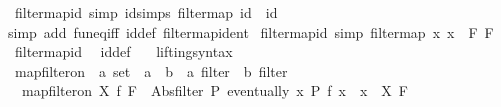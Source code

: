 \begin{isabellebody}
{\isafolddocument}%
%
\isadelimdocument
%
\endisadelimdocument
{}\isamarkupfalse%
\ filtermap{\isacharunderscore}{\kern0pt}id\ {\isacharbrackleft}{\kern0pt}simp{\isacharcomma}{\kern0pt}\ id{\isacharunderscore}{\kern0pt}simps{\isacharbrackright}{\kern0pt}{\isacharcolon}{\kern0pt}\ {\isachardoublequoteopen}filtermap\ id\ {\isacharequal}{\kern0pt}\ id{\isachardoublequoteclose}\isanewline
%
\isadelimproof
%
\endisadelimproof
%
\isatagproof
{}\isamarkupfalse%
{\isacharparenleft}{\kern0pt}simp\ add{\isacharcolon}{\kern0pt}\ fun{\isacharunderscore}{\kern0pt}eq{\isacharunderscore}{\kern0pt}iff\ id{\isacharunderscore}{\kern0pt}def\ filtermap{\isacharunderscore}{\kern0pt}ident{\isacharparenright}{\kern0pt}%
\endisatagproof
{\isafoldproof}%
%
\isadelimproof
\isanewline
%
\endisadelimproof
\isanewline
{}\isamarkupfalse%
\ filtermap{\isacharunderscore}{\kern0pt}id{\isacharprime}{\kern0pt}\ {\isacharbrackleft}{\kern0pt}simp{\isacharbrackright}{\kern0pt}{\isacharcolon}{\kern0pt}\ {\isachardoublequoteopen}filtermap\ {\isacharparenleft}{\kern0pt}{\isasymlambda}x{\isachardot}{\kern0pt}\ x{\isacharparenright}{\kern0pt}\ {\isacharequal}{\kern0pt}\ {\isacharparenleft}{\kern0pt}{\isasymlambda}F{\isachardot}{\kern0pt}\ F{\isacharparenright}{\kern0pt}{\isachardoublequoteclose}\isanewline
%
\isadelimproof
%
\endisadelimproof
%
\isatagproof
{}\isamarkupfalse%
\ filtermap{\isacharunderscore}{\kern0pt}id\ \isamarkupfalse%
\ id{\isacharunderscore}{\kern0pt}def\ \isacommand{{\isachardot}{\kern0pt}}\isamarkupfalse%
%
\endisatagproof
{\isafoldproof}%
%
\isadelimproof
\isanewline
%
\endisadelimproof
\isanewline
{}\isamarkupfalse%
\ \ lifting{\isacharunderscore}{\kern0pt}syntax\isanewline
{}\isanewline
\isanewline
{}\isamarkupfalse%
\ map{\isacharunderscore}{\kern0pt}filter{\isacharunderscore}{\kern0pt}on\ {\isacharcolon}{\kern0pt}{\isacharcolon}{\kern0pt}\ {\isachardoublequoteopen}{\isacharprime}{\kern0pt}a\ set\ {\isasymRightarrow}\ {\isacharparenleft}{\kern0pt}{\isacharprime}{\kern0pt}a\ {\isasymRightarrow}\ {\isacharprime}{\kern0pt}b{\isacharparenright}{\kern0pt}\ {\isasymRightarrow}\ {\isacharprime}{\kern0pt}a\ filter\ {\isasymRightarrow}\ {\isacharprime}{\kern0pt}b\ filter{\isachardoublequoteclose}\ \isanewline
\ \ {\isachardoublequoteopen}map{\isacharunderscore}{\kern0pt}filter{\isacharunderscore}{\kern0pt}on\ X\ f\ F\ {\isacharequal}{\kern0pt}\ Abs{\isacharunderscore}{\kern0pt}filter\ {\isacharparenleft}{\kern0pt}{\isasymlambda}P{\isachardot}{\kern0pt}\ eventually\ {\isacharparenleft}{\kern0pt}{\isasymlambda}x{\isachardot}{\kern0pt}\ P\ {\isacharparenleft}{\kern0pt}f\ x{\isacharparenright}{\kern0pt}\ {\isasymand}\ x\ {\isasymin}\ X{\isacharparenright}{\kern0pt}\ F{\isacharparenright}{\kern0pt}{\isachardoublequoteclose}\isanewline

\end{isabellebody}
